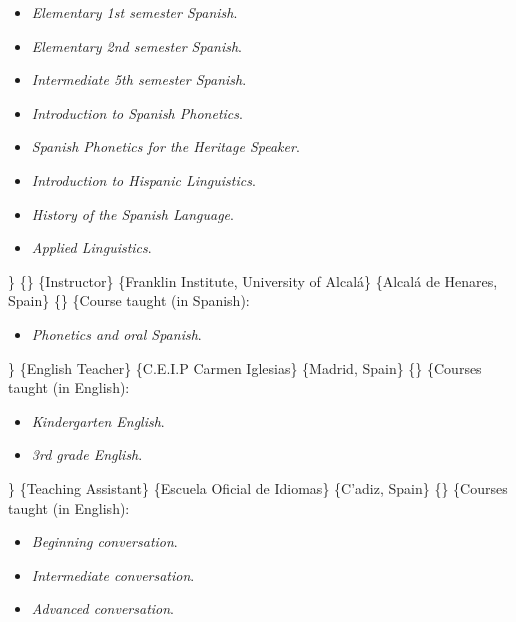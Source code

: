 \documentclass[11pt,letterpaper]{assets/tex/moderncv}
\begin{document}
\begin{itemize}
          \item[] \small \emph{Elementary 1st semester Spanish}.\vspace{-.03in}
          \item[] \small \emph{Elementary 2nd semester Spanish}.\vspace{-.03in}
          \item[] \small \emph{Intermediate 5th semester Spanish}.\vspace{-.03in}
          \item[] \small \emph{Introduction to Spanish Phonetics}.\vspace{-.03in}
          \item[] \small \emph{Spanish Phonetics for the Heritage Speaker}.\vspace{-.03in}
          \item[] \small \emph{Introduction to Hispanic Linguistics}.\vspace{-.03in}
          \item[] \small \emph{History of the Spanish Language}.\vspace{-.03in}
          \item[] \small \emph{Applied Linguistics}.
        \end{itemize}

\} \{\}  \{Instructor\} \{Franklin Institute,
University of Alcalá\} \{Alcalá de Henares, Spain\} \{\} \{Course taught
(in Spanish):

\begin{itemize}
          \item[] \small \emph{Phonetics and oral Spanish}.
        \end{itemize}

\}  \{English Teacher\} \{C.E.I.P Carmen
Iglesias\} \{Madrid, Spain\} \{\} \{Courses taught (in English):

\begin{itemize}
          \item[] \small \emph{Kindergarten English}.\vspace{-.03in}
          \item[] \small \emph{3rd grade English}.
        \end{itemize}

\}  \{Teaching Assistant\} \{Escuela Oficial de
Idiomas\} \{C'adiz, Spain\} \{\} \{Courses taught (in English):

\begin{itemize}
          \item[] \small \emph{Beginning conversation}.\vspace{-.03in}
          \item[] \small \emph{Intermediate conversation}.\vspace{-.03in}
          \item[] \small \emph{Advanced conversation}.
        \end{itemize}
\end{document}
